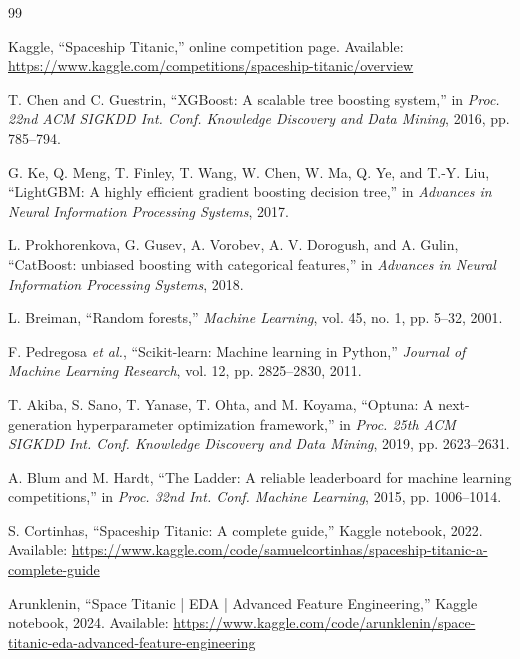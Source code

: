 \documentclass[conference]{IEEEtran}
\begin{document}
\balance
\begin{thebibliography}{99}

Kaggle, ``Spaceship Titanic,'' online competition page. Available: \url{https://www.kaggle.com/competitions/spaceship-titanic/overview}

T. Chen and C. Guestrin, ``XGBoost: A scalable tree boosting system,'' in \emph{Proc. 22nd ACM SIGKDD Int. Conf. Knowledge Discovery and Data Mining}, 2016, pp. 785--794.

G. Ke, Q. Meng, T. Finley, T. Wang, W. Chen, W. Ma, Q. Ye, and T.-Y. Liu, ``LightGBM: A highly efficient gradient boosting decision tree,'' in \emph{Advances in Neural Information Processing Systems}, 2017.

L. Prokhorenkova, G. Gusev, A. Vorobev, A. V. Dorogush, and A. Gulin, ``CatBoost: unbiased boosting with categorical features,'' in \emph{Advances in Neural Information Processing Systems}, 2018.

L. Breiman, ``Random forests,'' \emph{Machine Learning}, vol. 45, no. 1, pp. 5--32, 2001.

F. Pedregosa \emph{et al.}, ``Scikit-learn: Machine learning in Python,'' \emph{Journal of Machine Learning Research}, vol. 12, pp. 2825--2830, 2011.

T. Akiba, S. Sano, T. Yanase, T. Ohta, and M. Koyama, ``Optuna: A next-generation hyperparameter optimization framework,'' in \emph{Proc. 25th ACM SIGKDD Int. Conf. Knowledge Discovery and Data Mining}, 2019, pp. 2623--2631.

A. Blum and M. Hardt, ``The Ladder: A reliable leaderboard for machine learning competitions,'' in \emph{Proc. 32nd Int. Conf. Machine Learning}, 2015, pp. 1006--1014.

S. Cortinhas, ``Spaceship Titanic: A complete guide,'' Kaggle notebook, 2022. Available: \url{https://www.kaggle.com/code/samuelcortinhas/spaceship-titanic-a-complete-guide}

Arunklenin, ``Space Titanic | EDA | Advanced Feature Engineering,'' Kaggle notebook, 2024. Available: \url{https://www.kaggle.com/code/arunklenin/space-titanic-eda-advanced-feature-engineering}

\end{thebibliography}
\end{document}

